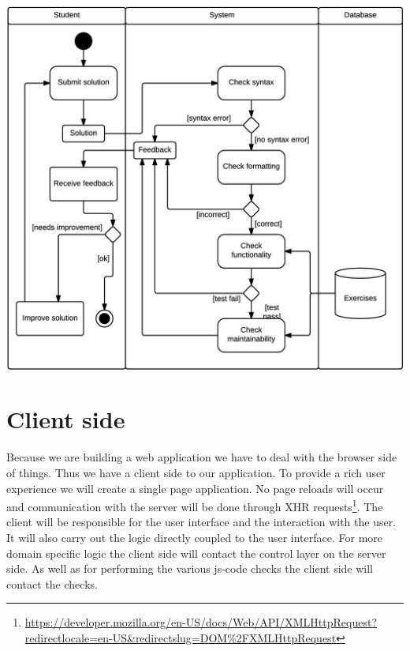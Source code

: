 \includegraphics[scale=0.75]{diagrams-images/code-submission-activity-diagram}

\section{Client side}
Because we are building a web application
we have to deal with the browser side of things.
Thus we have a client side to our application.
To provide a rich user experience we will create a single page application.
No page reloads will occur
and communication with the server will be done through
XHR requests\footnote{\url{https://developer.mozilla.org/en-US/docs/Web/API/XMLHttpRequest?redirectlocale=en-US&redirectslug=DOM\%2FXMLHttpRequest}}.
The client will be responsible for the user interface
and the interaction with the user.
It will also carry out the logic directly coupled to the user interface.
For more domain specific logic
the client side will contact the control layer on the server side.
As well as for performing the various \gls{js-code} \glspl{check}
the client side will contact the \glspl{check}.

